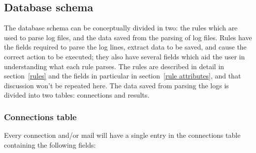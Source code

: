 \documentclass[a4paper,12pt,draft]{article}
\begin{document}
\subsection{Database schema}
\label{database schema}

The database schema can be conceptually divided in two: the rules which are
used to parse log files, and the data saved from the parsing of log files.
Rules have the fields required to parse the log lines, extract data to be
saved, and cause the correct action to be executed; they also have several
fields which aid the user in understanding what each rule parses.  The
rules are described in detail in section~\ref{rules} and the fields in
particular in section~\ref{rule attributes}, and that discussion won't be
repeated here.  The data saved from parsing the logs is divided into two
tables: connections and results.

\subsubsection{Connections table}

Every connection and/or mail will have a single entry in the connections
table containing the following fields:
\end{document}
